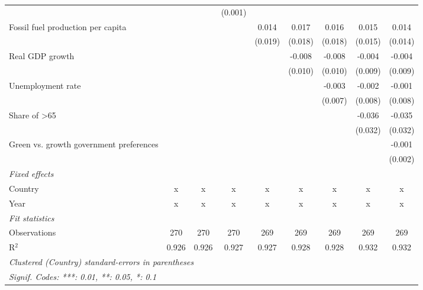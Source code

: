 \begin{table}[htbp]
\begin{tabular}{lcccccccc}
                                              &                &               & (0.001) &         &         &         &         &   \\   
      Fossil fuel production per capita       &                &               &         & 0.014   & 0.017   & 0.016   & 0.015   & 0.014\\   
                                              &                &               &         & (0.019) & (0.018) & (0.018) & (0.015) & (0.014)\\   
      Real GDP growth                         &                &               &         &         & -0.008  & -0.008  & -0.004  & -0.004\\   
                                              &                &               &         &         & (0.010) & (0.010) & (0.009) & (0.009)\\   
      Unemployment rate                       &                &               &         &         &         & -0.003  & -0.002  & -0.001\\   
                                              &                &               &         &         &         & (0.007) & (0.008) & (0.008)\\   
      Share of >65                            &                &               &         &         &         &         & -0.036  & -0.035\\   
                                              &                &               &         &         &         &         & (0.032) & (0.032)\\   
      Green vs. growth government preferences &                &               &         &         &         &         &         & -0.001\\   
                                              &                &               &         &         &         &         &         & (0.002)\\   
      \emph{Fixed effects}\\
      Country                                 & x              & x             & x       & x       & x       & x       & x       & x\\  
      Year                                    & x              & x             & x       & x       & x       & x       & x       & x\\  
      \midrule \emph{Fit statistics}\\
      Observations                            & 270            & 270           & 270     & 269     & 269     & 269     & 269     & 269\\  
      R$^2$                                   & 0.926          & 0.926         & 0.927   & 0.927   & 0.928   & 0.928   & 0.932   & 0.932\\  
      \midrule
      \multicolumn{9}{l}{\emph{Clustered (Country) standard-errors in parentheses}}\\
      \multicolumn{9}{l}{\emph{Signif. Codes: ***: 0.01, **: 0.05, *: 0.1}}\\
   \end{tabular}
\end{table}


